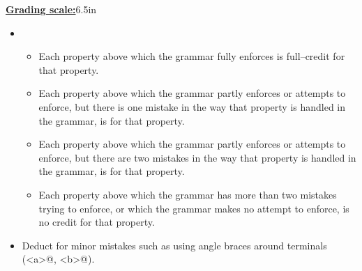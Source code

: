 \documentclass[11pt,fleqn]{article}
\begin{document}
\begin{enumerate}
\begin{info}{\textbf{\underline{Grading scale:}}}{6.5in}
            \begin{itemize}

              \addtolength{\itemsep}{1mm}

              \item \begin{itemize}

                      \addtolength{\itemsep}{1mm}

                      \item Each property above which the grammar fully
                            enforces is full--credit for that property.

                      \item Each property above which the grammar partly
                            enforces or attempts to enforce, but there is one
                            mistake in the way that property is handled in the
                            grammar, is  for that property.

                      \item Each property above which the grammar partly
                            enforces or attempts to enforce, but there are
                            two mistakes in the way that property is handled
                            in the grammar, is  for that property.

                      \item Each property above which the grammar has more
                            than two mistakes trying to enforce, or which
                            the grammar makes no attempt to enforce, is no
                            credit for that property.

                 \end{itemize}

            \item Deduct  for minor mistakes such as using angle
                  braces around terminals (\verb@<a>@, \verb@<b>@).


            \end{itemize}

          \end{info}

          \vspace{-1.5mm}


\end{enumerate}
\end{document}
